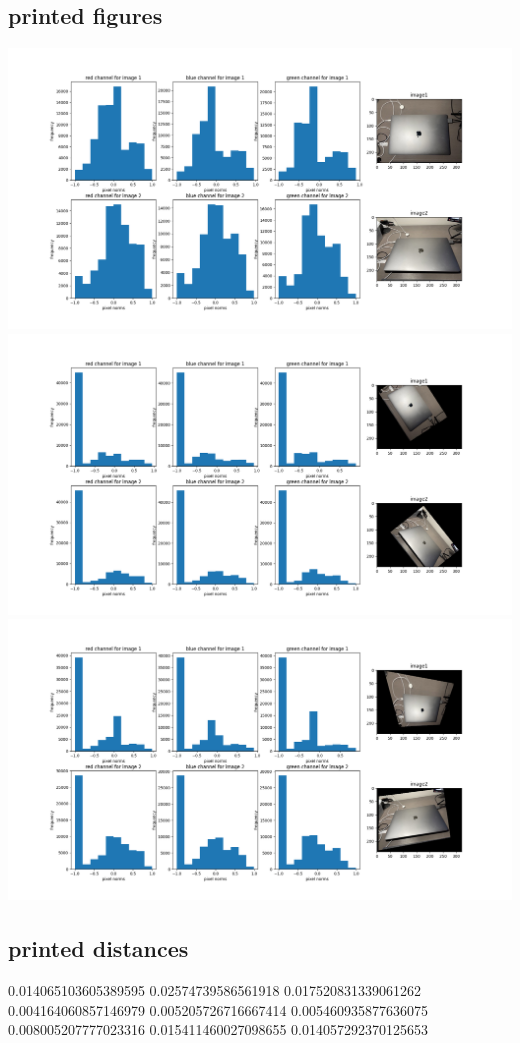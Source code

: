 \documentclass{article}
\begin{document}
\subsection{printed figures}
\includegraphics[scale=0.38]{1.png}\\
\includegraphics[scale=0.38]{2.png}\\
\includegraphics[scale=0.38]{3.png}
\subsection{printed distances}
0.014065103605389595 0.02574739586561918 0.017520831339061262\\
0.004164060857146979 0.005205726716667414 0.005460935877636075\\
0.008005207777023316 0.015411460027098655 0.014057292370125653
\end{document}
